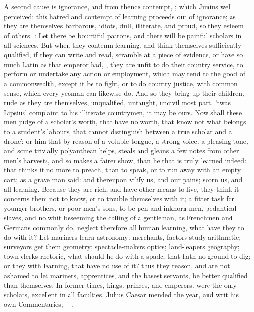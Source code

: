 {{A second cause is ignorance, and from thence contempt, ; which Junius well perceived: this
hatred and contempt of learning proceeds out of ignorance; as
they are themselves barbarous, idiots, dull, illiterate, and proud, so
they esteem of others. : Let
there be bountiful patrons, and there will be painful scholars in all
sciences. But when they contemn learning, and think themselves
sufficiently qualified, if they can write and read, scramble at a piece
of evidence, or have so much Latin as that emperor had, , they are unfit to do their country
service, to perform or undertake any action or employment, which may
tend to the good of a commonwealth, except it be to fight, or to do
country justice, with common sense, which every yeoman can likewise do.
And so they bring up their children, rude as they are themselves,
unqualified, untaught, uncivil most part.  'twas Lipsius' complaint to his illiterate
countrymen, it may be ours. Now shall these men judge of a scholar's
worth, that have no worth, that know not what belongs to a student's
labours, that cannot distinguish between a true scholar and a drone? or
him that by reason of a voluble tongue, a strong voice, a pleasing
tone, and some trivially polyanthean helps, steals and gleans a few
notes from other men's harvests, and so makes a fairer show, than he
that is truly learned indeed: that thinks it no more to preach, than to
speak, or to run away with an empty cart; as a grave man said:
and thereupon vilify us, and our pains; scorn us, and all learning.
 Because they are rich, and have other means to live, they think
it concerns them not to know, or to trouble themselves with it; a
fitter task for younger brothers, or poor men's sons, to be pen and
inkhorn men, pedantical slaves, and no whit beseeming the calling of a
gentleman, as Frenchmen and Germans commonly do, neglect therefore all
human learning, what have they to do with it? Let mariners learn
astronomy; merchants, factors study arithmetic; surveyors get them
geometry; spectacle-makers optics; land-leapers geography; town-clerks
rhetoric, what should he do with a spade, that hath no ground to dig;
or they with learning, that have no use of it? thus they reason, and
are not ashamed to let mariners, apprentices, and the basest servants,
be better qualified than themselves. In former times, kings, princes,
and emperors, were the only scholars, excellent in all faculties.
Julius Caesar mended the year, and writ his own Commentaries,
---.

}}
